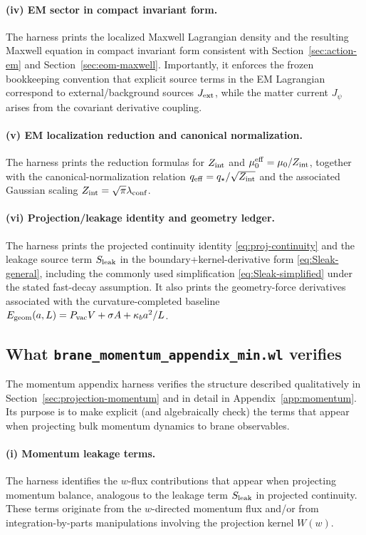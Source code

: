 \documentclass[11pt]{article}
\newcommand{\qstar}{q_\star}
\newcommand{\qeff}{q_{\rm eff}}
\newcommand{\Zint}{Z_{\rm int}}
\newcommand{\kappab}{\kappa_b}
\begin{document}
\paragraph{(iv) EM sector in compact invariant form.}
The harness prints the localized Maxwell Lagrangian density and the resulting Maxwell equation in compact invariant form consistent with Section~\ref{sec:action-em} and Section~\ref{sec:eom-maxwell}. Importantly, it enforces the frozen bookkeeping convention that explicit source terms in the EM Lagrangian correspond to external/background sources $J_{\rm ext}$, while the matter current $J_\psi$ arises from the covariant derivative coupling.

\paragraph{(v) EM localization reduction and canonical normalization.}
The harness prints the reduction formulas for $\Zint$ and $\mu_0^{\rm eff}=\mu_0/\Zint$, together with the canonical-normalization relation $\qeff=\qstar/\sqrt{\Zint}$ and the associated Gaussian scaling $\Zint=\sqrt{\pi}\lambda_{\rm conf}$.

\paragraph{(vi) Projection/leakage identity and geometry ledger.}
The harness prints the projected continuity identity \eqref{eq:proj-continuity} and the leakage source term $S_{\rm leak}$ in the boundary+kernel-derivative form \eqref{eq:Sleak-general}, including the commonly used simplification \eqref{eq:Sleak-simplified} under the stated fast-decay assumption. It also prints the geometry-force derivatives associated with the curvature-completed baseline $E_{\rm geom}(a,L)=P_{\rm vac}V+\sigma A+\kappab a^2/L$.

\subsection{What \texttt{brane\_momentum\_appendix\_min.wl} verifies}
\label{app:wl-momentum}

The momentum appendix harness verifies the structure described qualitatively in Section~\ref{sec:projection-momentum} and in detail in Appendix~\ref{app:momentum}. Its purpose is to make explicit (and algebraically check) the terms that appear when projecting bulk momentum dynamics to brane observables.

\paragraph{(i) Momentum leakage terms.}
The harness identifies the $w$-flux contributions that appear when projecting momentum balance, analogous to the leakage term $S_{\rm leak}$ in projected continuity. These terms originate from the $w$-directed momentum flux and/or from integration-by-parts manipulations involving the projection kernel $W(w)$.
\end{document}
